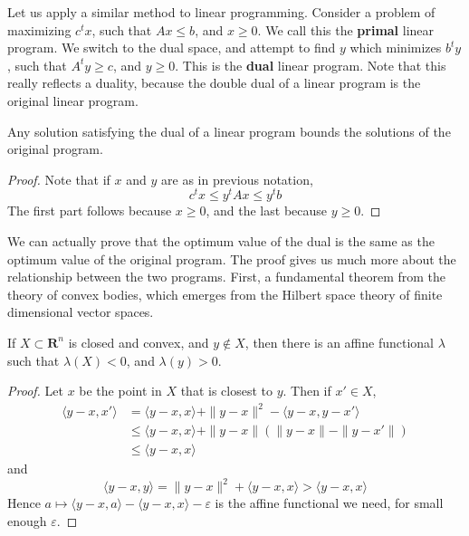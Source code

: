 Let us apply a similar method to linear programming. Consider a problem of maximizing $c^t x$, such that $Ax \leq b$, and $x \geq 0$. We call this the {\bf primal} linear program. We switch to the dual space, and attempt to find $y$ which minimizes $b^t y$, such that $A^t y \geq c$, and $y \geq 0$. This is the {\bf dual} linear program. Note that this really reflects a duality, because the double dual of a linear program is the original linear program.

\begin{theorem}
    Any solution satisfying the dual of a linear program bounds the solutions of the original program.
\end{theorem}
\begin{proof}
    Note that if $x$ and $y$ are as in previous notation,
    \[ c^t x \leq y^t A x \leq y^t b \]
    The first part follows because $x \geq 0$, and the last because $y \geq 0$.
\end{proof}

We can actually prove that the optimum value of the dual is the same as the optimum value of the original program. The proof gives us much more about the relationship between the two programs. First, a fundamental theorem from the theory of convex bodies, which emerges from the Hilbert space theory of finite dimensional vector spaces.

\begin{theorem}
    If $X \subset \mathbf{R}^n$ is closed and convex, and $y \not \in X$, then there is an affine functional $\lambda$ such that $\lambda(X) < 0$, and $\lambda(y) > 0$.
\end{theorem}
\begin{proof}
    Let $x$ be the point in $X$ that is closest to $y$. Then if $x' \in X$,
    \begin{align*}
        \langle y - x, x' \rangle &= \langle y - x, x \rangle + \| y - x \|^2 - \langle y - x, y - x' \rangle\\
        &\leq \langle y - x, x \rangle + \| y - x \| \left( \| y - x \| - \| y - x' \| \right)\\
        &\leq \langle y - x, x \rangle
    \end{align*}
    and
    \[ \langle y - x , y \rangle = \| y - x \|^2 + \langle y - x, x \rangle > \langle y - x, x \rangle \]
    Hence $a \mapsto \langle y - x, a \rangle - \langle y - x, x \rangle - \varepsilon$ is the affine functional we need, for small enough $\varepsilon$.
\end{proof}

